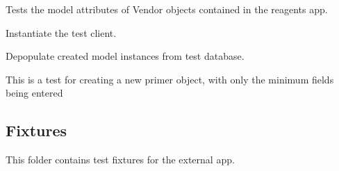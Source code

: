 \documentclass[letterpaper,10pt,english]{sphinxmanual}
\begin{document}
\begin{fulllineitems}
\label{api:experimentdb.external.tests.VendorModelTests}
Tests the model attributes of Vendor objects contained in the reagents app.


\begin{fulllineitems}
\label{api:experimentdb.external.tests.VendorModelTests.setUp}
Instantiate the test client.


\end{fulllineitems}


\begin{fulllineitems}
\label{api:experimentdb.external.tests.VendorModelTests.tearDown}
Depopulate created model instances from test database.


\end{fulllineitems}


\begin{fulllineitems}
\label{api:experimentdb.external.tests.VendorModelTests.test_create_vendor_minimal}
This is a test for creating a new primer object, with only the minimum fields being entered


\end{fulllineitems}


\begin{fulllineitems}
\label{api:experimentdb.external.tests.VendorModelTests.test_vendor_absolute_url}
\end{fulllineitems}


\end{fulllineitems}



\subsection{Fixtures}
\label{api:id15}\label{api:module-experimentdb.external.fixtures}
This folder contains test fixtures for the external app.
\end{document}

